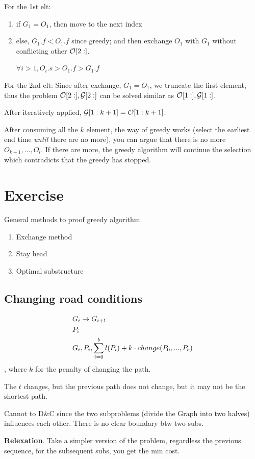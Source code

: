 \documentclass[a4paper]{report}
\begin{document}
For the 1st elt:
\begin{enumerate}
\item if $G_1=O_1$, then move to the next index
\item else, $G_1.f < O_1.f$ since greedy; and then exchange $O_1$ with $G_1$ without conflicting other $\mathcal{O}[2:]$. 

$\forall i>1, O_i.s > O_1.f >G_1.f$
\end{enumerate}

For the 2nd elt: Since after exchange, $G_1=O_1$, we truncate the first element, thus the problem $\mathcal{O}[2:], \mathcal{G}[2:]$ can be solved similar as  $\mathcal{O}[1:], \mathcal{G}[1:]$.

After iteratively applied, $\mathcal{G}[1:k+1]=\mathcal{O}[1:k+1]$.

After consuming all the $k$ element, the way of greedy works (select the earliest end time \textit{until} there are no more), you can argue that there is no more $O_{k+1},..., O_l$. If there are more, the greedy algorithm will continue the selection which contradicts that the greedy has stopped.

\section{Exercise}
General methods to proof greedy algorithm
\begin{enumerate}
\item Exchange method
\item Stay head 
\item Optimal substructure 
\end{enumerate}
\subsection{Changing road conditions}
\begin{align*}
& G_i \rightarrow G_{i+1}\\
& P_i \\
& G_i, P_i, \sum_{i=0}^b l(P_i)+k \cdot change(P_0, ..., P_b)
\end{align*}
, where $k$ for the penalty of changing the path. 

The $t$ changes, but the previous path does not change, but it may not be the shortest path. 

Cannot to D\&C since the two subproblems (divide the Graph into two halves) influences each other. There is no clear boundary btw two subs. 

\textbf{Relexation}. Take a simpler version of the problem, regardless the previous sequence, for the subsequent subs, you get the min cost. 
\end{document}
